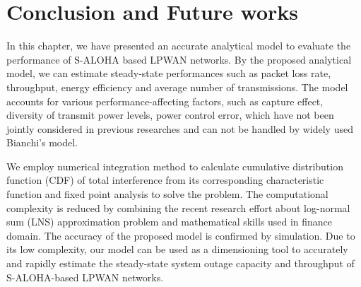 \section{Conclusion and Future works}
\label{sec:icc17-conclusion}
In this chapter, we have presented an accurate analytical model to evaluate the performance of S-ALOHA based LPWAN networks. By the proposed analytical model, we can estimate steady-state performances such as packet loss rate, throughput, energy efficiency and average number of transmissions. The model accounts for various performance-affecting factors, such as capture effect, diversity of transmit power levels, power control error, which have not been jointly considered in previous researches and can not be handled by widely used Bianchi's model.

We employ numerical integration method to calculate cumulative distribution function (CDF) of total interference from its corresponding characteristic function and fixed point analysis to solve the problem. The computational complexity is reduced by combining the recent research effort about log-normal sum (LNS) approximation problem and mathematical skills used in finance domain. The accuracy of the proposed model is confirmed by simulation. Due to its low complexity, our model can be used as a dimensioning tool to accurately and rapidly estimate the steady-state system outage capacity and throughput of  S-ALOHA-based LPWAN networks. 

